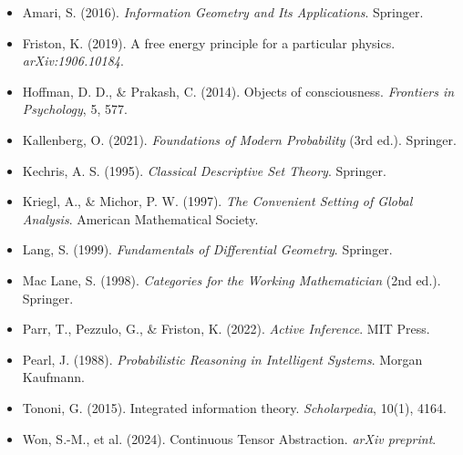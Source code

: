\documentclass[11pt,a4paper]{article}
\theoremstyle{definition}
\theoremstyle{plain}
\theoremstyle{remark}
\begin{document}
\begin{itemize}[leftmargin=*]
    \item Amari, S. (2016). \textit{Information Geometry and Its Applications}. Springer.

    \item Friston, K. (2019). A free energy principle for a particular physics. \textit{arXiv:1906.10184}.

    \item Hoffman, D. D., \& Prakash, C. (2014). Objects of consciousness. \textit{Frontiers in Psychology}, 5, 577.

    \item Kallenberg, O. (2021). \textit{Foundations of Modern Probability} (3rd ed.). Springer.

    \item Kechris, A. S. (1995). \textit{Classical Descriptive Set Theory}. Springer.

    \item Kriegl, A., \& Michor, P. W. (1997). \textit{The Convenient Setting of Global Analysis}. American Mathematical Society.

    \item Lang, S. (1999). \textit{Fundamentals of Differential Geometry}. Springer.

    \item Mac Lane, S. (1998). \textit{Categories for the Working Mathematician} (2nd ed.). Springer.

    \item Parr, T., Pezzulo, G., \& Friston, K. (2022). \textit{Active Inference}. MIT Press.

    \item Pearl, J. (1988). \textit{Probabilistic Reasoning in Intelligent Systems}. Morgan Kaufmann.

    \item Tononi, G. (2015). Integrated information theory. \textit{Scholarpedia}, 10(1), 4164.

    \item Won, S.-M., et al. (2024). Continuous Tensor Abstraction. \textit{arXiv preprint}.
\end{itemize}
\end{document}
